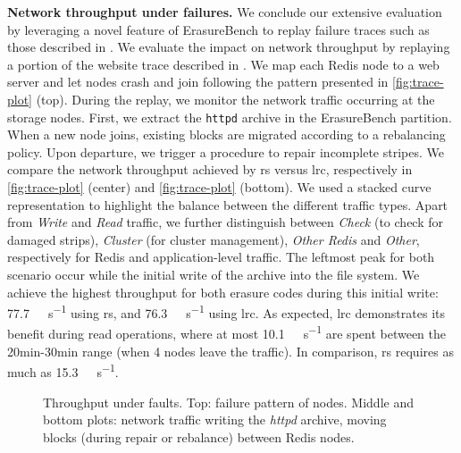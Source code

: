\textbf{Network throughput under failures.}
\label{subsec:fault-trace}
We conclude our extensive evaluation by leveraging a novel feature of ErasureBench to replay failure traces such as those described in \autocite{fta-journal}.
We evaluate the impact on network throughput by replaying a portion of the website trace described in \autocite{websites02}.
We map each Redis node to a web server and let nodes crash and join following the pattern presented in \autoref{fig:trace-plot} (top).
During the replay, we monitor the network traffic occurring at the storage nodes.
First, we extract the \texttt{httpd} archive in the ErasureBench partition.
When a new node joins, existing blocks are migrated according to a rebalancing policy.
Upon departure, we trigger a procedure to repair incomplete stripes.
We compare the network throughput achieved by \ac{rs} versus \ac{lrc}, respectively in \autoref{fig:trace-plot} (center) and \autoref{fig:trace-plot} (bottom).
We used a stacked curve representation to highlight the balance between the different traffic types. 
Apart from \textit{Write} and \textit{Read} traffic, we further distinguish between \textit{Check} (to check for damaged strips), \textit{Cluster} (for cluster management), \textit{Other Redis} and \textit{Other}, respectively for Redis and application-level traffic.
The leftmost peak for both scenario occur while the initial write of the archive into the file system.
We achieve the highest throughput for both erasure codes during this initial write: \SI{77.7}{\mega\byte\per\second} using \ac{rs}, and \SI{76.3}{\mega\byte\per\second} using \ac{lrc}.
As expected, \ac{lrc} demonstrates its benefit during read operations, where at most \SI{10.1}{\mega\byte\per\second} are spent between the 20min-30min range (when 4 nodes leave the traffic). 
In comparison, \ac{rs} requires as much as \SI{15.3}{\mega\byte\per\second}.
\begin{figure}[ht]
    \centering
    
    \caption{Throughput under faults. Top: failure pattern of nodes. Middle and bottom plots: network traffic writing the \textit{httpd} archive, moving blocks (during repair or rebalance) between Redis nodes.}
    \label{fig:trace-plot}
\end{figure}
